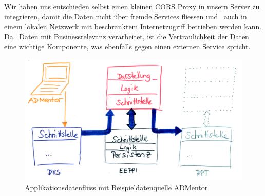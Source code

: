 		Wir haben uns entschieden selbst einen kleinen CORS Proxy in unsern Server zu integrieren,
		damit die Daten nicht über fremde Services fliessen und
		\eeppi\ auch in einem lokalen Netzwerk mit beschränktem Internetzugriff betrieben werden kann.
		Da \eeppi\ Daten mit Businessrelevanz verarbeitet, ist die Vertraulichkeit der Daten eine wichtige Komponente, was ebenfalls gegen einen externen Service spricht.
		
	
	\begin{figure}[H]
		\includegraphics[width=\textwidth]{architecture/media/img/eeppiDataflow.jpg}
		\centering
		\caption{Applikationsdatenfluss mit Beispieldatenquelle ADMentor}
		\label{fig:applicationDataFlow}
	\end{figure}		